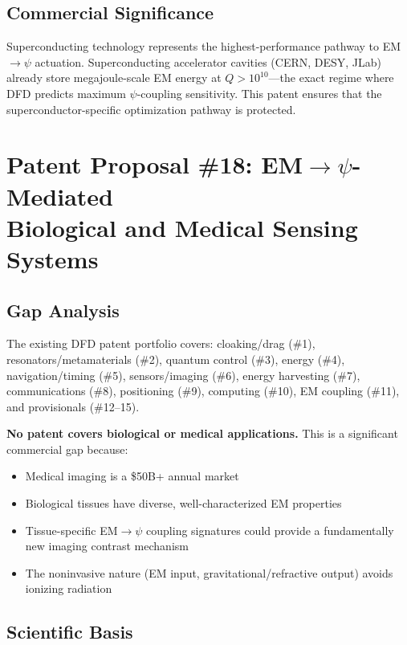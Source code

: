 \documentclass[12pt,letterpaper]{article}
\begin{document}
\subsection{Commercial Significance}

Superconducting technology represents the highest-performance pathway
to EM$\to\psi$ actuation. Superconducting accelerator cavities
(CERN, DESY, JLab) already store megajoule-scale EM energy at
$Q > 10^{10}$---the exact regime where DFD predicts maximum
$\psi$-coupling sensitivity. This patent ensures that the
superconductor-specific optimization pathway is protected.

\section{Patent Proposal \#18: EM$\to\psi$-Mediated\\
Biological and Medical Sensing Systems}

\subsection{Gap Analysis}

The existing DFD patent portfolio covers: cloaking/drag (\#1),
resonators/metamaterials (\#2), quantum control (\#3), energy (\#4),
navigation/timing (\#5), sensors/imaging (\#6), energy harvesting (\#7),
communications (\#8), positioning (\#9), computing (\#10), EM coupling
(\#11), and provisionals (\#12--15).

\textbf{No patent covers biological or medical applications.} This is
a significant commercial gap because:
\begin{itemize}
\item Medical imaging is a \$50B+ annual market
\item Biological tissues have diverse, well-characterized EM properties
\item Tissue-specific EM$\to\psi$ coupling signatures could provide a
fundamentally new imaging contrast mechanism
\item The noninvasive nature (EM input, gravitational/refractive output)
avoids ionizing radiation
\end{itemize}

\subsection{Scientific Basis}
\end{document}
